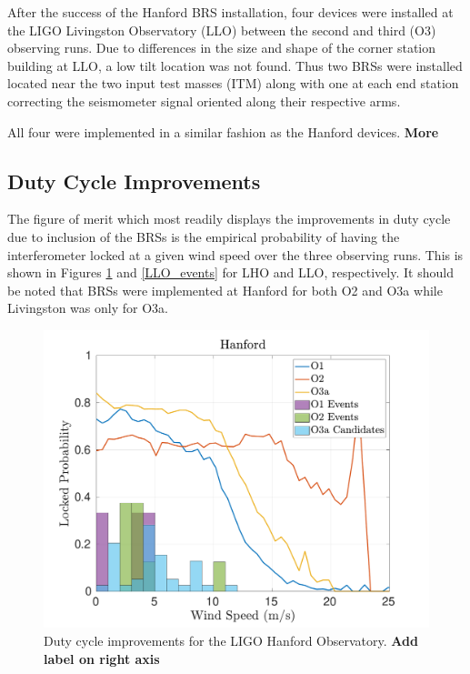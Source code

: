 \documentclass [12pt, proquest]{uwthesis}[2019]
\begin{document}
\quad After the success of the Hanford BRS installation, four devices were installed at the LIGO Livingston Observatory (LLO) between the second and third (O3) observing runs. Due to differences in the size and shape of the corner station building at LLO, a low tilt location was not found. Thus two BRSs were installed located near the two input test masses (ITM) along with one at each end station correcting the seismometer signal oriented along their respective arms. 

All four were implemented in a similar fashion as the Hanford devices. \textbf{More}

\subsection{Duty Cycle Improvements}

The figure of merit which most readily displays the improvements in duty cycle due to inclusion of the BRSs is the empirical probability of having the interferometer locked at a given wind speed over the three observing runs. This is shown in Figures \ref{LHO_events} and \ref{LLO_events} for LHO and LLO, respectively. It should be noted that BRSs were implemented at Hanford for both O2 and O3a while Livingston was only for O3a.

\begin{figure}%
\begin{center}
\includegraphics[width=\textwidth]{LHO_WindVsLockEvents.pdf}
\caption{Duty cycle improvements for the LIGO Hanford Observatory. \textbf{Add label on right axis}}
\label{LHO_events}
\end{center}
\end{figure}
\end{document}
